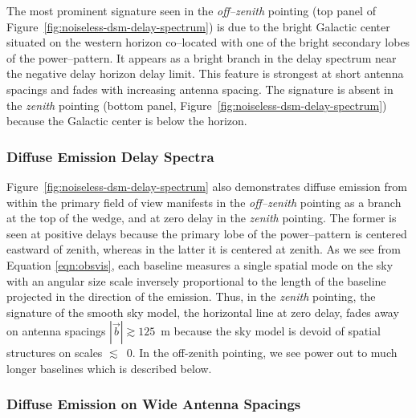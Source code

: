 \documentclass[preprint2,iop,numberedappendix]{emulateapj}
\begin{document}
The most prominent signature seen in the {\it off--zenith} pointing (top panel of Figure~\ref{fig:noiseless-dsm-delay-spectrum}) is due to the bright Galactic center situated on the western horizon co--located with one of the bright secondary lobes of the power--pattern. It appears as a bright branch in the delay spectrum near the negative delay horizon delay limit. This feature is strongest at short antenna spacings and fades with increasing antenna spacing. The signature is absent in the {\it zenith} pointing (bottom panel, Figure~\ref{fig:noiseless-dsm-delay-spectrum}) because the Galactic center is below the horizon. 

\subsubsection{Diffuse Emission Delay Spectra}\label{sec:diffuse-features}

Figure~\ref{fig:noiseless-dsm-delay-spectrum} also demonstrates diffuse emission from within the primary field of view manifests in the {\it off--zenith} pointing as a branch at the top of the wedge, and at zero delay in the {\it zenith} pointing. The former is seen at positive delays because the primary lobe of the power--pattern is centered eastward of zenith, whereas in the latter it is centered at zenith. As we see from Equation \ref{eqn:obsvis}, each baseline measures a single spatial mode on the sky with an angular size scale inversely proportional to the length of the baseline projected in the direction of the emission. Thus, in the {\it zenith} pointing, the signature of the smooth sky model, the horizontal line at zero delay, fades away on antenna spacings $|\vec{b}| \gtrsim 125$~m because the sky model is devoid of spatial structures on scales $\lesssim$~0. In the off-zenith pointing, we see power out to much longer baselines which is described below.

\subsubsection{Diffuse Emission on Wide Antenna Spacings}\label{sec:diffuse-long-baselines}
\end{document}
